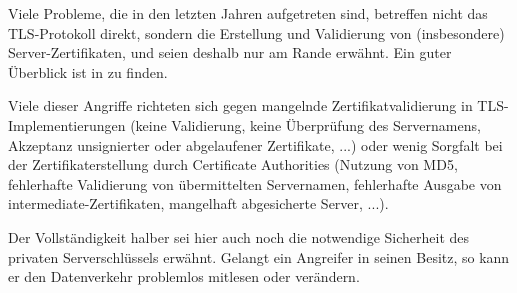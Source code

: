 Viele Probleme, die in den letzten Jahren aufgetreten sind, betreffen nicht das TLS-Protokoll direkt, sondern die Erstellung und Validierung von (insbesondere) Server-Zertifikaten, und seien deshalb nur am Rande erwähnt. Ein guter Überblick ist in \cite{meyer13} zu finden.

Viele dieser Angriffe richteten sich gegen mangelnde Zertifikatvalidierung in TLS-Implementierungen (keine Validierung, keine Überprüfung des Servernamens, Akzeptanz unsignierter oder abgelaufener Zertifikate, ...) oder wenig Sorgfalt bei der Zertifikaterstellung durch Certificate Authorities (Nutzung von MD5, fehlerhafte Validierung von übermittelten Servernamen, fehlerhafte Ausgabe von intermediate-Zertifikaten, mangelhaft abgesicherte Server, ...).

Der Vollständigkeit halber sei hier auch noch die notwendige Sicherheit des privaten Serverschlüssels erwähnt. Gelangt ein Angreifer in seinen Besitz, so kann er den Datenverkehr problemlos mitlesen oder verändern.